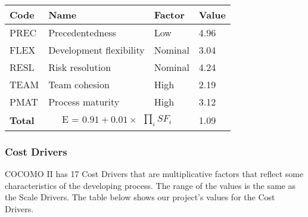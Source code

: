 	\begin{tabular}{|l|l|l|l|}
	\hline
	\textbf{Code} & \textbf{Name} & \textbf{Factor} & \textbf{Value}\\
	\hline
	PREC & Precedentedness & Low & 4.96\\
	\hline
	FLEX & Development flexibility & Nominal & 3.04\\
	\hline
	RESL & Risk resolution & Nominal & 4.24\\
	\hline
	TEAM & Team cohesion & High & 2.19\\
	\hline
	PMAT & Process maturity & High & 3.12\\
	\hline
	\textbf{Total} & \multicolumn{2}{|c|}{E = $ 0.91 + 0.01 \times \begin{matrix} \prod_{i} SF_i \end{matrix}$} & 1.09\\
	\hline	
	\end{tabular}
	
	\vspace{2em}

\subsubsection{Cost Drivers}

COCOMO II has 17 Cost Drivers that are multiplicative factors that reflect some characteristics of the developing process. 
The range of the values is the same as the Scale Drivers.
The table below shows our project's values for the Cost Drivers.\\ 
	
